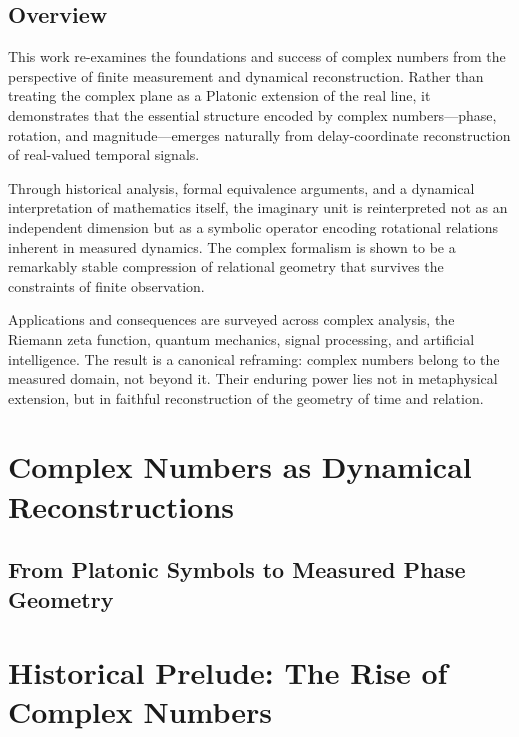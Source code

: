 \documentclass[12pt]{book}  %
\begin{document}


\maketitle
\newpage

\section*{Overview}
This work re-examines the foundations and success of complex numbers from the perspective of finite measurement and dynamical reconstruction. Rather than treating the complex plane as a Platonic extension of the real line, it demonstrates that the essential structure encoded by complex numbers—phase, rotation, and magnitude—emerges naturally from delay-coordinate reconstruction of real-valued temporal signals.

Through historical analysis, formal equivalence arguments, and a dynamical interpretation of mathematics itself, the imaginary unit is reinterpreted not as an independent dimension but as a symbolic operator encoding rotational relations inherent in measured dynamics. The complex formalism is shown to be a remarkably stable compression of relational geometry that survives the constraints of finite observation.

Applications and consequences are surveyed across complex analysis, the Riemann zeta function, quantum mechanics, signal processing, and artificial intelligence. The result is a canonical reframing: complex numbers belong to the measured domain, not beyond it. Their enduring power lies not in metaphysical extension, but in faithful reconstruction of the geometry of time and relation.


\tableofcontents

\mainmatter

\chapter{Complex Numbers as Dynamical Reconstructions}
\section*{From Platonic Symbols to Measured Phase Geometry}

\chapter{Historical Prelude: The Rise of Complex Numbers}
\end{document}
